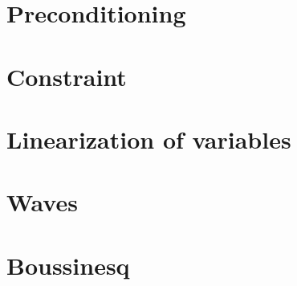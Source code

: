 \documentclass[12pt,a4paper,oneside,openright]{report} %
\begin{document}
\chapter{Preconditioning}
\label{app:precon}


\chapter{Constraint}


\chapter{Linearization of variables}
\label{app:linearized}


\chapter{Waves}
\label{app:waves}


\chapter{Boussinesq}
\label{app:boussinesq}




\end{document}
